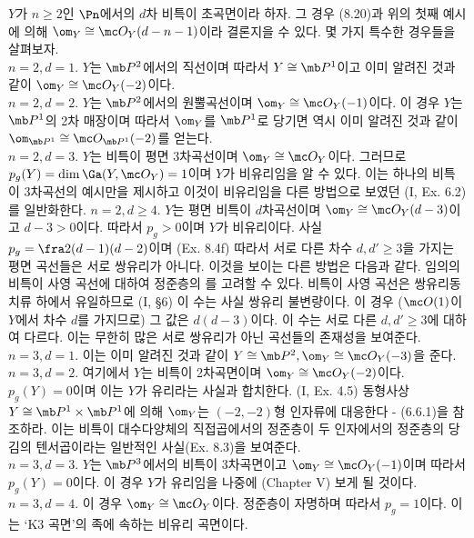 	
	\begin{example}
	$Y$가 $n\ge 2$인 $\Pn$에서의 $d$차 비특이 초곡면이라 하자.
	그 경우 (8.20)과 위의 첫째 예시에 의해 $\om_Y\cong\mc O_Y(d-n-1)$이라 결론지을 수 있다. 몇 가지 특수한 경우들을 살펴보자.\\
	$n=2,d=1$. $Y$는 $\mb P^2$에서의 직선이며 따라서 $Y\cong\mb P^1$이고 이미 알려진 것과 같이 $\om_Y\cong\mc O_Y(-2)$이다.\\
	$n=2,d=2$. $Y$는 $\mb P^2$에서의 원뿔곡선이며 $\om_Y\cong\mc O_Y(-1)$이다.
	이 경우 $Y$는 $\mb P^1$의 2차 매장이며 따라서 $\om_Y$를 $\mb P^1$로 당기면
	역시 이미 알려진 것과 같이 $\om_{\mb P^1}\cong\mc O_{\mb P^1}(-2)$를 얻는다.\\
	$n=2,d=3$. $Y$는 비특이 평면 3차곡선이며 $\om_Y\cong\mc O_Y$이다.
	그러므로 $p_g(Y)=\dim\Ga(Y,\mc O_Y)=1$이며 $Y$가 비유리임을 알 수 있다.
	이는 하나의 비특이 3차곡선의 예시만을 제시하고 이것이 비유리임을 다른 방법으로 보였던 (I, Ex. 6.2)를 일반화한다.
	$n=2,d\ge 4$. $Y$는 평면 비특이 $d$차곡선이며 $\om_Y\cong\mc O_Y(d-3)$이고 $d-3>0$이다.
	따라서 $p_g>0$이며 $Y$가 비유리이다.
	사실 $p_g=\fra 2(d-1)(d-2)$이며 (Ex. 8.4f) 따라서 서로 다른 차수 $d,d'\ge 3$을 가지는 평면 곡선들은 서로 쌍유리가 아니다.
	이것을 보이는 다른 방법은 다음과 같다.
	임의의 비특이 사영 곡선에 대하여 정준층의 를 고려할 수 있다.
	비특이 사영 곡선은 쌍유리동치류 하에서 유일하므로 (I, \S 6) 이 수는 사실 쌍유리 불변량이다.
	이 경우 ($\mc O(1)$이 $Y$에서 차수 $d$를 가지므로) 그 값은 $d(d-3)$이다.
	이 수는 서로 다른 $d,d'\ge 3$에 대하여 다르다. 이는 무한히 많은 서로 쌍유리가 아닌 곡선들의 존재성을 보여준다.\\
	$n=3,d=1$. 이는 이미 알려진 것과 같이 $Y\cong\mb P^2,\om_Y\cong\mc O_Y(-3)$을 준다.\\
	$n=3,d=2$. 여기에서 $Y$는 비특이 2차곡면이며 $\om_Y\cong\mc O_Y(-2)$이다.
	$p_g(Y)=0$이며 이는 $Y$가 유리라는 사실과 합치한다. (I, Ex. 4.5)
	동형사상 $Y\cong\mb P^1\times\mb P^1$에 의해 $\om_Y$는 $(-2,-2)$형 인자류에 대응한다 - (6.6.1)을 참조하라.
	이는 비특이 대수다양체의 직접곱에서의 정준층이 두 인자에서의 정준층의 당김의 텐서곱이라는 일반적인 사실(Ex. 8.3)을 보여준다.\\
	$n=3,d=3$. $Y$는 $\mb P^3$에서의 비특이 3차곡면이고 $\om_Y\cong\mc O_Y(-1)$이며 따라서 $p_g(Y)=0$이다.
	이 경우 $Y$가 유리임을 나중에 (Chapter V) 보게 될 것이다.\\
	$n=3,d=4$. 이 경우 $\om_Y\cong\mc O_Y$이다. 정준층이 자명하며 따라서 $p_g=1$이다. 이는 `K3 곡면'의 족에 속하는 비유리 곡면이다.\\

\end{example}
